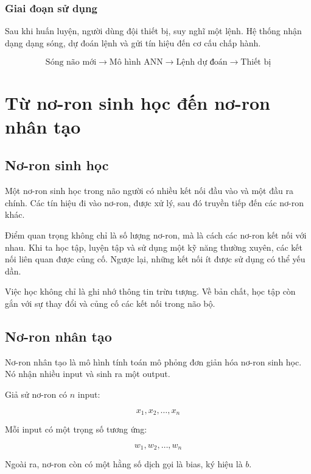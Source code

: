 \documentclass[12pt,a4paper]{report}
\begin{document}
\subsection{Giai đoạn sử dụng}

Sau khi huấn luyện, người dùng đội thiết bị, suy nghĩ một lệnh. Hệ thống nhận dạng dạng sóng, dự đoán lệnh và gửi tín hiệu đến cơ cấu chấp hành.

\[
    \text{Sóng não mới} \rightarrow \text{Mô hình ANN} \rightarrow \text{Lệnh dự đoán} \rightarrow \text{Thiết bị}
\]

\chapter{Từ nơ-ron sinh học đến nơ-ron nhân tạo}

\section{Nơ-ron sinh học}

Một nơ-ron sinh học trong não người có nhiều kết nối đầu vào và một đầu ra chính. Các tín hiệu đi vào nơ-ron, được xử lý, sau đó truyền tiếp đến các nơ-ron khác.

Điểm quan trọng không chỉ là số lượng nơ-ron, mà là cách các nơ-ron kết nối với nhau. Khi ta học tập, luyện tập và sử dụng một kỹ năng thường xuyên, các kết nối liên quan được củng cố. Ngược lại, những kết nối ít được sử dụng có thể yếu dần.

\begin{ghinho}
Việc học không chỉ là ghi nhớ thông tin trừu tượng. Về bản chất, học tập còn gắn với sự thay đổi và củng cố các kết nối trong não bộ.
\end{ghinho}

\section{Nơ-ron nhân tạo}

Nơ-ron nhân tạo là mô hình tính toán mô phỏng đơn giản hóa nơ-ron sinh học. Nó nhận nhiều input và sinh ra một output.

Giả sử nơ-ron có $n$ input:

\[
    x_1, x_2, \ldots, x_n
\]

Mỗi input có một trọng số tương ứng:

\[
    w_1, w_2, \ldots, w_n
\]

Ngoài ra, nơ-ron còn có một hằng số dịch gọi là bias, ký hiệu là $b$.
\end{document}
